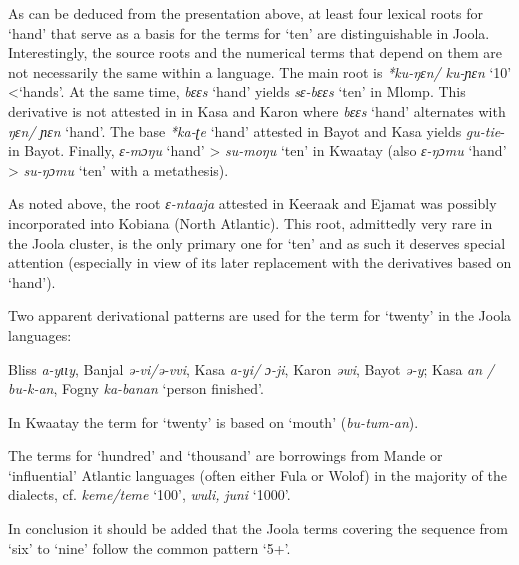 {As can be deduced from the presentation above, at least four lexical roots for ‘hand’ that serve as a basis for the terms for ‘ten’ are distinguishable in Joola. Interestingly, the source roots and the numerical terms that depend on them are not necessarily the same within a language. The main root is \textit{*ku-ŋɛn/} \textit{ku-ɲɛn} ‘10’ <‘hands’. At the same time, \textit{bɛɛs} ‘hand’ yields \textit{sɛ-bɛɛs} ‘ten’ in Mlomp. This derivative is not attested in in Kasa and Karon where \textit{bɛɛs} ‘hand’ alternates with \textit{ŋɛn/} \textit{ɲɛn} ‘hand’. The base \textit{*ka-ʈe} ‘hand’ attested in Bayot and Kasa yields \textit{gu-tie}- in Bayot. Finally, \textit{ɛ-mɔŋu} ‘hand’ > \textit{su-moŋu} ‘ten’ in Kwaatay (also \textit{ɛ-ŋɔmu} ‘hand’ > \textit{su-ŋɔmu} ‘ten’ with a metathesis).

As noted above, the root \textit{ɛ-ntaaja} attested in Keeraak and Ejamat was possibly incorporated into Kobiana (North Atlantic). This root, admittedly very rare in the Joola cluster, is the only primary one for ‘ten’ and as such it deserves special attention (especially in view of its later replacement with the derivatives based on ‘hand’). 


Two apparent derivational patterns are used for the term for ‘twenty’ in the Joola languages:

\begin{exe}
 Bliss \textit{a-yɩɩy}, Banjal \textit{ə-vi/ə-vvi}, Kasa \textit{a-yi/} \textit{ɔ-ji}, Karon \textit{əwi}, Bayot \textit{ə-y};
 Kasa \textit{an} \textit{/} \textit{bu-k-an}, Fogny \textit{ka-banan} ‘person finished’.
\end{exe}


In Kwaatay the term for ‘twenty’ is based on ‘mouth’ (\textit{bu-tum-an}).

The terms for ‘hundred’ and ‘thousand’ are borrowings from Mande or ‘influential’ Atlantic languages (often either Fula or Wolof) in the majority of the dialects, cf. \textit{keme/teme} ‘100’, \textit{wuli,} \textit{juni} ‘1000’.

In conclusion it should be added that the Joola terms covering the sequence from ‘six’ to ‘nine’ follow the common pattern ‘5+’.

}
